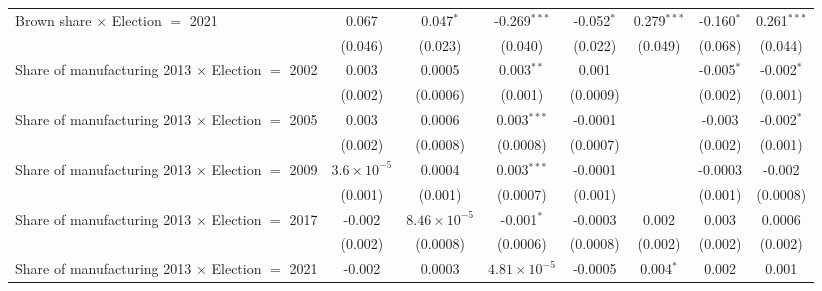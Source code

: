 \begin{table}[htbp]
\begin{tabular}{lccccccc}
      Brown share $\times$ Election $=$ 2021                  & 0.067                & 0.047$^{*}$           & -0.269$^{***}$        & -0.052$^{*}$   & 0.279$^{***}$  & -0.160$^{*}$   & 0.261$^{***}$\\   
                                                              & (0.046)              & (0.023)               & (0.040)               & (0.022)        & (0.049)        & (0.068)        & (0.044)\\   
      Share of manufacturing 2013 $\times$ Election $=$ 2002  & 0.003                & 0.0005                & 0.003$^{**}$          & 0.001          &                & -0.005$^{*}$   & -0.002$^{*}$\\   
                                                              & (0.002)              & (0.0006)              & (0.001)               & (0.0009)       &                & (0.002)        & (0.001)\\   
      Share of manufacturing 2013 $\times$ Election $=$ 2005  & 0.003                & 0.0006                & 0.003$^{***}$         & -0.0001        &                & -0.003         & -0.002$^{*}$\\   
                                                              & (0.002)              & (0.0008)              & (0.0008)              & (0.0007)       &                & (0.002)        & (0.001)\\   
      Share of manufacturing 2013 $\times$ Election $=$ 2009  & $3.6\times 10^{-5}$  & 0.0004                & 0.003$^{***}$         & -0.0001        &                & -0.0003        & -0.002\\   
                                                              & (0.001)              & (0.001)               & (0.0007)              & (0.001)        &                & (0.001)        & (0.0008)\\   
      Share of manufacturing 2013 $\times$ Election $=$ 2017  & -0.002               & $8.46\times 10^{-5}$  & -0.001$^{*}$          & -0.0003        & 0.002          & 0.003          & 0.0006\\   
                                                              & (0.002)              & (0.0008)              & (0.0006)              & (0.0008)       & (0.002)        & (0.002)        & (0.002)\\   
      Share of manufacturing 2013 $\times$ Election $=$ 2021  & -0.002               & 0.0003                & $4.81\times 10^{-5}$  & -0.0005        & 0.004$^{*}$    & 0.002          & 0.001\\   

\end{tabular}
\end{table}
